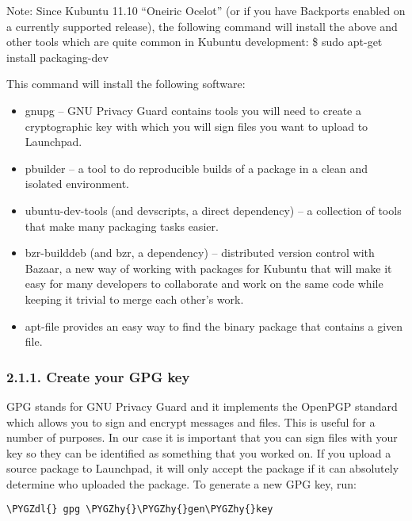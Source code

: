 \documentclass[letterpaper,10pt,english]{sphinxmanual}
\def\PYGZdl{\char`\$}
\def\PYGZhy{\char`\-}
\begin{document}
Note: Since Kubuntu 11.10 “Oneiric Ocelot” (or if you have Backports enabled on a currently supported release), the following command will install the above and other tools which are quite common in Kubuntu development:
\$ sudo apt-get install packaging-dev

This command will install the following software:
\begin{itemize}
\item {} 
gnupg – GNU Privacy Guard contains tools you will need to create a cryptographic key with which you will sign files you want to upload to Launchpad.

\item {} 
pbuilder – a tool to do reproducible builds of a package in a clean and isolated environment.

\item {} 
ubuntu-dev-tools (and devscripts, a direct dependency) – a collection of tools that make many packaging tasks easier.

\item {} 
bzr-builddeb (and bzr, a dependency) – distributed version control with Bazaar, a new way of working with packages for Kubuntu that will make it easy for many developers to collaborate and work on the same code while keeping it trivial to merge each other’s work.

\item {} 
apt-file provides an easy way to find the binary package that contains a given file.

\end{itemize}


\subsubsection{2.1.1. Create your GPG key}
\label{docs/packaging_guide/getting_started:create-your-gpg-key}
GPG stands for GNU Privacy Guard and it implements the OpenPGP standard which allows you to sign and encrypt messages and files. This is useful for a number of purposes. In our case it is important that you can sign files with your key so they can be identified as something that you worked on. If you upload a source package to Launchpad, it will only accept the package if it can absolutely determine who uploaded the package.
To generate a new GPG key, run:

\begin{Verbatim}[commandchars=\\\{\}]
\PYGZdl{} gpg \PYGZhy{}\PYGZhy{}gen\PYGZhy{}key
\end{Verbatim}
\end{document}
